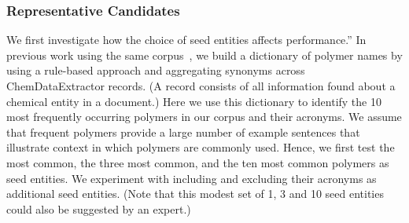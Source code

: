 \subsubsection{Representative Candidates}
We first investigate how the choice of seed entities affects performance.''
In previous work using the same corpus~\cite{tchoua2016hybrid,tchoua2016hybridi}, we build a dictionary of polymer names by using a rule-based approach and aggregating synonyms across ChemDataExtractor records. (A record consists of all information found about a chemical entity in a document.)  
Here we use this dictionary to identify the 10 most frequently occurring polymers in our corpus and their acronyms.
We assume that frequent polymers provide a large number of example sentences that illustrate context in which polymers are commonly used.
Hence, we first test the most common, the three most common, and the ten most common polymers as seed entities.
We experiment with including and excluding their acronyms as additional seed entities.
(Note that this modest set of 1, 3 and 10 seed entities could also be suggested by an expert.)

